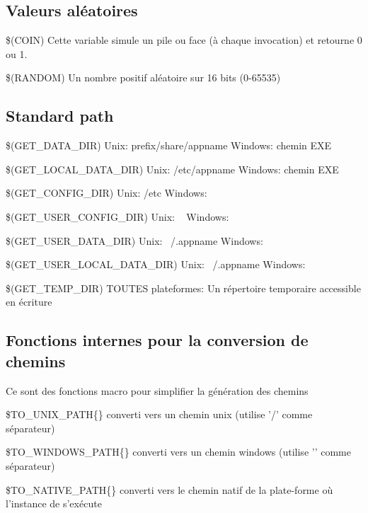 \subsection{Valeurs aléatoires}

\begin{codeentry}
\item[\$(COIN)] Cette variable simule un pile ou face (à chaque invocation) et retourne 0 ou 1.
\item[\$(RANDOM)] Un nombre positif aléatoire sur 16 bits (0-65535)
\end{codeentry}

\subsection{Standard path}

\begin{codeentry}
\item[\$(GET\_DATA\_DIR)] Unix: prefix/share/appname Windows: chemin EXE
\item[\$(GET\_LOCAL\_DATA\_DIR)] Unix: /etc/appname Windows: chemin EXE
\item[\$(GET\_CONFIG\_DIR)] Unix: /etc Windows: 
\item[\$(GET\_USER\_CONFIG\_DIR)] Unix: ~ Windows: 
\item[\$(GET\_USER\_DATA\_DIR)] Unix: ~/.appname Windows: 
\item[\$(GET\_USER\_LOCAL\_DATA\_DIR)] Unix: ~/.appname Windows: 
\item[\$(GET\_TEMP\_DIR)] TOUTES plateformes: Un répertoire temporaire accessible en écriture
\end{codeentry}

\subsection{Fonctions internes pour la conversion de chemins}
Ce sont des fonctions macro pour simplifier la génération des chemins 
\begin{codeentry}
\item[\$TO\_UNIX\_PATH\{\}] converti vers un chemin unix (utilise '/' comme séparateur)
\item[\$TO\_WINDOWS\_PATH\{\}] converti vers un chemin windows (utilise '\osp' comme séparateur)
\item[\$TO\_NATIVE\_PATH\{\}] converti vers le chemin natif de la plate-forme où l'instance de \codeblocks s'exécute
\end{codeentry}

